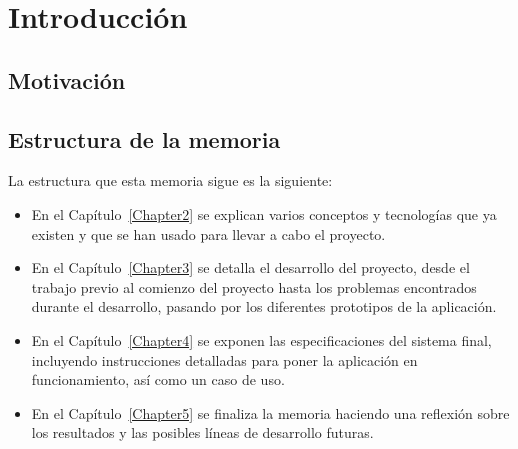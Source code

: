 
\chapter{Introducción} %

\label{Chapter1} %


\newcommand{\keyword}[1]{\textbf{#1}}
\newcommand{\tabhead}[1]{\textbf{#1}}
\newcommand{\code}[1]{\texttt{#1}}
\newcommand{\file}[1]{\texttt{\bfseries#1}}
\newcommand{\option}[1]{\texttt{\itshape#1}}


\section{Motivación}


\section{Estructura de la memoria}

La estructura que esta memoria sigue es la siguiente:

\begin{itemize}
    \item En el Capítulo~\ref{Chapter2} se explican varios conceptos y tecnologías que ya existen y que se han usado para llevar a cabo el proyecto.
    \item En el Capítulo~\ref{Chapter3} se detalla el desarrollo del proyecto, desde el trabajo previo al comienzo del proyecto hasta los problemas encontrados durante el desarrollo, pasando por los diferentes prototipos de la aplicación.
    \item En el Capítulo~\ref{Chapter4} se exponen las especificaciones del sistema final, incluyendo instrucciones detalladas para poner la aplicación en funcionamiento, así como un caso de uso.
    \item En el Capítulo~\ref{Chapter5} se finaliza la memoria haciendo una reflexión sobre los resultados y las posibles líneas de desarrollo futuras.
\end{itemize}

